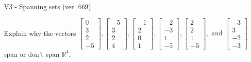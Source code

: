 \begin{exercise}
  \begin{exerciseTitle}V3 - Spanning sets (ver. 669)\end{exerciseTitle}
  \begin{exerciseStatement}
    Explain why the vectors \(\left[\begin{array}{r}
0 \\
3 \\
2 \\
-5
\end{array}\right] , \left[\begin{array}{r}
-5 \\
3 \\
2 \\
4
\end{array}\right] , \left[\begin{array}{r}
-1 \\
2 \\
0 \\
1
\end{array}\right] , \left[\begin{array}{r}
-2 \\
-3 \\
1 \\
-5
\end{array}\right] , \left[\begin{array}{r}
2 \\
2 \\
1 \\
-5
\end{array}\right] , \text{ and } \left[\begin{array}{r}
-3 \\
3 \\
-2 \\
-3
\end{array}\right]\) span or don't span \(\mathbb{R}^4\). 
	



\end{exerciseStatement}
\end{exercise}

